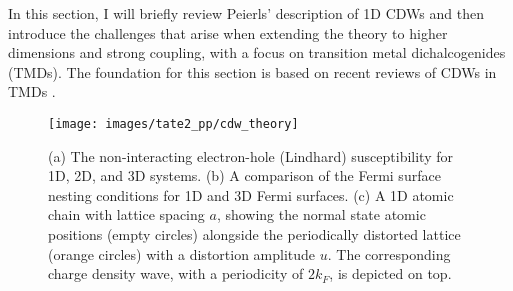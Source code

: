 In this section, I will briefly review Peierls' description of 1D CDWs and then introduce the challenges that arise when extending the theory to higher dimensions and strong coupling, with a focus on transition metal dichalcogenides (TMDs).
The foundation for this section is based on recent reviews of CDWs in TMDs \cite{rossnagel_origin_2011, canadell_importance_1992}.


\begin{figure}[t]
	\centering
	\texttt{[image: images/tate2\_pp/cdw\_theory]}
	\caption{(a) The non-interacting electron-hole (Lindhard) susceptibility for 1D, 2D, and 3D systems. (b) A comparison of the Fermi surface nesting conditions for 1D and 3D Fermi surfaces. (c) A 1D atomic chain with lattice spacing $a$, showing the normal state atomic positions (empty circles) alongside the periodically distorted lattice (orange circles) with a distortion amplitude $u$. The corresponding charge density wave, with a periodicity of $2k_F$, is depicted on top.}
	\label{fig:cdw_theory}
\end{figure}


